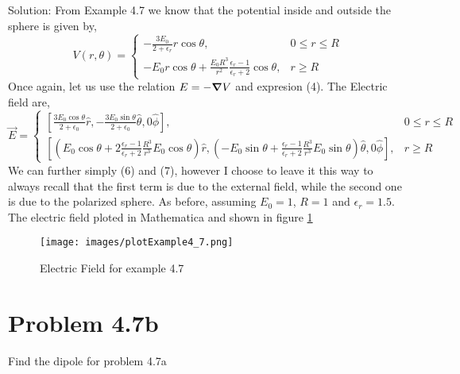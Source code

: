 Solution: From Example 4.7 we know that the potential inside and outside the sphere is given by,
\begin{equation}
	V(r,\theta) = \begin{cases}
		-\frac{3E_0}{2+\epsilon_r}r\cos\theta, & 0\leq r\leq R \\
		-E_0 r\cos\theta+\frac{E_0R^3}{r^2}\frac{\epsilon_r-1}{\epsilon_r+2}\cos\theta, & r\geq R
	\end{cases}
\end{equation}
Once again, let us use the relation $E = -\mbox{\boldmath$ \nabla $} V$ and expresion (4). The Electric field are,
\begin{equation}
	\vec{E} = \begin{cases}
		\left[\frac{3E_0\cos\theta}{2+\epsilon_0}\hat{r},
					-\frac{3E_0\sin\theta}{2+\epsilon_0}\hat{\theta},
					0\hat{\phi} \right], & 0\leq r\leq R \\
		\left[(E_0\cos\theta+2\frac{\epsilon_r-1}{\epsilon_r+2}\frac{R^3}{r^3}E_0\cos\theta)\hat{r},
					(-E_0\sin\theta+\frac{\epsilon_r-1}{\epsilon_r+2}\frac{R^3}{r^3}E_0\sin\theta)\hat{\theta}, 
					0\hat{\phi} \right], & r\geq R
	\end{cases}
\end{equation}
We can further simply (6) and (7), however I choose to leave it this way to always recall that the first term is due to the external field, while the second one is due to the polarized sphere.
As before, assuming $E_0=1$, $R=1$ and $\epsilon_r=1.5$. The electric field ploted in Mathematica and shown in figure \ref{fig:Efield_4.7}
\begin{figure}
	\centering
	\texttt{[image: images/plotExample4\_7.png]} 
	\caption{Electric Field for example 4.7}
	\label{fig:Efield_4.7}
\end{figure}

\section{Problem 4.7b}
Find the dipole for problem 4.7a\\

